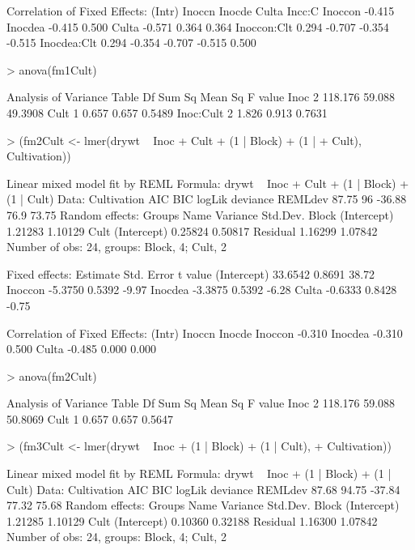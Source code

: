\documentclass[12pt]{article}
\begin{document}
\begin{Schunk}
\begin{Soutput}
Correlation of Fixed Effects:
            (Intr) Inoccn Inocde Culta  Incc:C
Inoccon     -0.415                            
Inocdea     -0.415  0.500                     
Culta       -0.571  0.364  0.364              
Inoccon:Clt  0.294 -0.707 -0.354 -0.515       
Inocdea:Clt  0.294 -0.354 -0.707 -0.515  0.500
\end{Soutput}
\begin{Sinput}
> anova(fm1Cult)
\end{Sinput}
\begin{Soutput}
Analysis of Variance Table
          Df  Sum Sq Mean Sq F value
Inoc       2 118.176  59.088 49.3908
Cult       1   0.657   0.657  0.5489
Inoc:Cult  2   1.826   0.913  0.7631
\end{Soutput}
\begin{Sinput}
> (fm2Cult <- lmer(drywt ~ Inoc + Cult + (1 | Block) + (1 | 
+     Cult), Cultivation))
\end{Sinput}
\begin{Soutput}
Linear mixed model fit by REML 
Formula: drywt ~ Inoc + Cult + (1 | Block) + (1 | Cult) 
   Data: Cultivation 
   AIC BIC logLik deviance REMLdev
 87.75  96 -36.88     76.9   73.75
Random effects:
 Groups   Name        Variance Std.Dev.
 Block    (Intercept) 1.21283  1.10129 
 Cult     (Intercept) 0.25824  0.50817 
 Residual             1.16299  1.07842 
Number of obs: 24, groups: Block, 4; Cult, 2

Fixed effects:
            Estimate Std. Error t value
(Intercept)  33.6542     0.8691   38.72
Inoccon      -5.3750     0.5392   -9.97
Inocdea      -3.3875     0.5392   -6.28
Culta        -0.6333     0.8428   -0.75

Correlation of Fixed Effects:
        (Intr) Inoccn Inocde
Inoccon -0.310              
Inocdea -0.310  0.500       
Culta   -0.485  0.000  0.000
\end{Soutput}
\begin{Sinput}
> anova(fm2Cult)
\end{Sinput}
\begin{Soutput}
Analysis of Variance Table
     Df  Sum Sq Mean Sq F value
Inoc  2 118.176  59.088 50.8069
Cult  1   0.657   0.657  0.5647
\end{Soutput}
\begin{Sinput}
> (fm3Cult <- lmer(drywt ~ Inoc + (1 | Block) + (1 | Cult), 
+     Cultivation))
\end{Sinput}
\begin{Soutput}
Linear mixed model fit by REML 
Formula: drywt ~ Inoc + (1 | Block) + (1 | Cult) 
   Data: Cultivation 
   AIC   BIC logLik deviance REMLdev
 87.68 94.75 -37.84    77.32   75.68
Random effects:
 Groups   Name        Variance Std.Dev.
 Block    (Intercept) 1.21285  1.10129 
 Cult     (Intercept) 0.10360  0.32188 
 Residual             1.16300  1.07842 
Number of obs: 24, groups: Block, 4; Cult, 2


\end{Soutput}
\end{Schunk}
\end{document}
